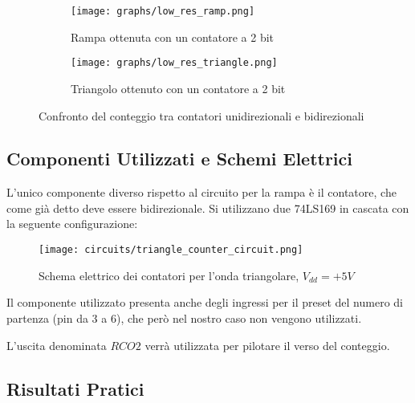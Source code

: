 \begin{figure}[ht]
    \centering

    \begin{subfigure}{.5\textwidth}
        \centering
        \texttt{[image: graphs/low\_res\_ramp.png]}
        \caption{Rampa ottenuta con un contatore a 2 bit}
    \end{subfigure}%
    \begin{subfigure}{.5\textwidth}
        \centering
        \texttt{[image: graphs/low\_res\_triangle.png]}
        \caption{Triangolo ottenuto con un contatore a 2 bit}
    \end{subfigure}

    \caption{Confronto del conteggio tra contatori unidirezionali e bidirezionali}
    \label{steps}
\end{figure}


\subsection*{Componenti Utilizzati e Schemi Elettrici}

L'unico componente diverso rispetto al circuito per la rampa è il contatore, che come già
detto deve essere bidirezionale. Si utilizzano due 74LS169 \cite{74ls169} in cascata con
la seguente configurazione:
\medskip

\begin{figure}[ht]
    \centering
    \texttt{[image: circuits/triangle\_counter\_circuit.png]}
    \caption{Schema elettrico dei contatori per l'onda triangolare, $V_{dd}=+5V$}
    \label{triangle_counter_circuit}
\end{figure}

Il componente utilizzato presenta anche degli ingressi per il preset del numero di partenza
(pin da 3 a 6), che però nel nostro caso non vengono utilizzati.

L'uscita denominata $RCO2$ verrà utilizzata per pilotare il verso del conteggio.


\subsection*{Risultati Pratici}


